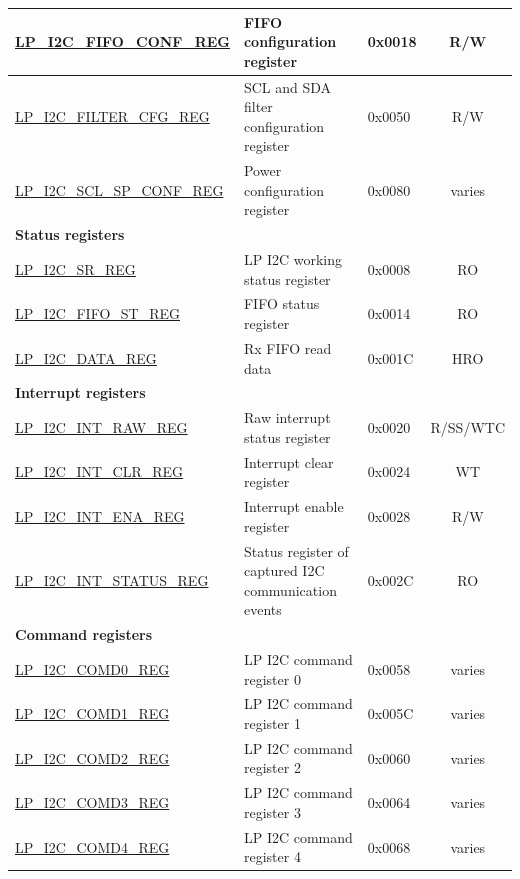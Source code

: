 \begin{longtable}{ | p{6.1cm} | p{6.8cm} | p{1.3cm} | c | }
\hyperref[regdesc:LPI2CFIFOCONFREG]{LP\_I2C\_FIFO\_CONF\_REG} & FIFO configuration register & 0x0018 & R/W \\ \hline
\hyperref[regdesc:LPI2CFILTERCFGREG]{LP\_I2C\_FILTER\_CFG\_REG} & SCL and SDA filter configuration register & 0x0050 & R/W \\ \hline
\hyperref[regdesc:LPI2CSCLSPCONFREG]{LP\_I2C\_SCL\_SP\_CONF\_REG} & Power configuration register & 0x0080 & varies \\ \hline
\multicolumn{4}{|l|}{\textbf{Status registers}} \\ \hline
\hyperref[regdesc:LPI2CSRREG]{LP\_I2C\_SR\_REG} & LP I2C working status register & 0x0008 & RO \\ \hline
\hyperref[regdesc:LPI2CFIFOSTREG]{LP\_I2C\_FIFO\_ST\_REG} & FIFO status register & 0x0014 & RO \\ \hline
\hyperref[regdesc:LPI2CDATAREG]{LP\_I2C\_DATA\_REG} & Rx FIFO read data & 0x001C & HRO \\ \hline
\multicolumn{4}{|l|}{\textbf{Interrupt registers}} \\ \hline
\hyperref[regdesc:LPI2CINTRAWREG]{LP\_I2C\_INT\_RAW\_REG} & Raw interrupt status register & 0x0020 & R/SS/WTC \\ \hline
\hyperref[regdesc:LPI2CINTCLRREG]{LP\_I2C\_INT\_CLR\_REG} & Interrupt clear register & 0x0024 & WT \\ \hline
\hyperref[regdesc:LPI2CINTENAREG]{LP\_I2C\_INT\_ENA\_REG} & Interrupt enable register & 0x0028 & R/W \\ \hline
\hyperref[regdesc:LPI2CINTSTATUSREG]{LP\_I2C\_INT\_STATUS\_REG} & Status register of captured I2C communication events & 0x002C & RO \\ \hline
\multicolumn{4}{|l|}{\textbf{Command registers}} \\ \hline
\hyperref[regdesc:LPI2CCOMD0REG]{LP\_I2C\_COMD0\_REG} & LP I2C command register 0 & 0x0058 & varies \\ \hline
\hyperref[regdesc:LPI2CCOMD1REG]{LP\_I2C\_COMD1\_REG} & LP I2C command register 1 & 0x005C & varies \\ \hline
\hyperref[regdesc:LPI2CCOMD2REG]{LP\_I2C\_COMD2\_REG} & LP I2C command register 2 & 0x0060 & varies \\ \hline
\hyperref[regdesc:LPI2CCOMD3REG]{LP\_I2C\_COMD3\_REG} & LP I2C command register 3 & 0x0064 & varies \\ \hline
\hyperref[regdesc:LPI2CCOMD4REG]{LP\_I2C\_COMD4\_REG} & LP I2C command register 4 & 0x0068 & varies \\ \hline

\end{longtable}
